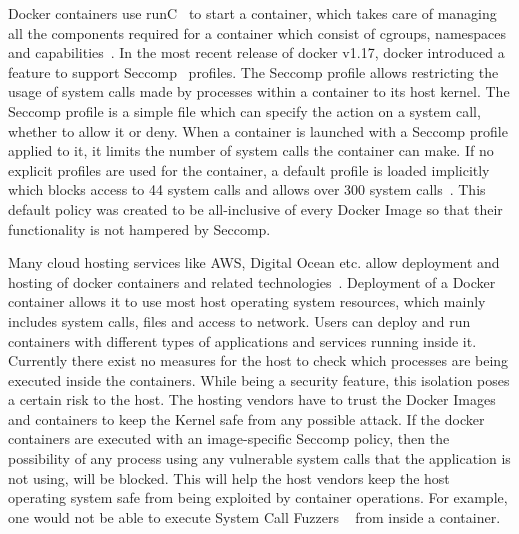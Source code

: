 Docker containers use runC~\cite{solomonhykes2015} to start a container, which takes care of managing all the components required for a container which consist of  cgroups, namespaces and capabilities~\cite{dockersec1}. In the most recent release of docker v1.17, docker introduced a feature to support Seccomp~\cite{seccomp} profiles. The Seccomp profile allows restricting the usage of system calls made by processes within a container to its host kernel. The Seccomp profile is a simple file which can specify the action on a system call, whether to allow it or deny. When a container is launched with a Seccomp profile applied to it, it limits the number of system calls the container can make. If no explicit profiles are used for the container, a default profile is loaded implicitly which blocks access to 44 system calls and allows over 300 system calls~\cite{seccomp}. This default policy was created to be all-inclusive of every Docker Image so that their functionality is not hampered by Seccomp.

Many cloud hosting services like AWS, Digital Ocean etc. allow deployment and hosting of docker containers and related technologies~\cite{awsdigitalocean}. Deployment of a Docker container allows it to use most host operating system resources, which mainly includes system calls, files and access to network. Users can deploy and run containers with different types of applications and services running inside it. Currently there exist no measures for the host to check which processes are being executed inside the containers. While being a security feature, this isolation poses a certain risk to the host. The hosting vendors have to trust the Docker Images and containers to keep the Kernel safe from any possible attack. If the docker containers are executed with an image-specific Seccomp policy, then the possibility of any process using any vulnerable system calls that the application is not using, will be blocked. This will help the host vendors keep the host operating system safe from being exploited by container operations. For example, one would not be able to execute System Call Fuzzers ~\cite{kernelsyscallfuzzer} from inside a container.

